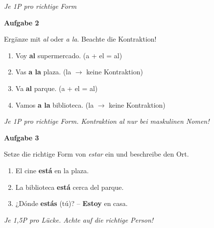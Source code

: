\documentclass[11pt, a4paper]{article}
\newcommand{\fachfarbe}{spanisch}
\newcommand{\punktebox}[1]{\hfill\fbox{\small \_/#1}}
\newcommand{\loesung}[1]{\textcolor{loesung}{\textbf{#1}}}
\newenvironment{aufgabe}[1]{%
    \vspace{10pt}
    \noindent\textbf{\textcolor{\fachfarbe}{Aufgabe #1}}
    \vspace{5pt}
    \begin{list}{}{\leftmargin=0pt}
    \item[]
}{%
    \end{list}
}
\begin{document}
\textit{\textcolor{grau}{Je 1P pro richtige Form}}

\vspace{15pt}


\begin{aufgabe}{2}
Ergänze mit \textit{al} oder \textit{a la}. Beachte die Kontraktion! \punktebox{4}
\end{aufgabe}

\begin{enumerate}[label=\alph*)]
    \item Voy \loesung{al} supermercado. (a + el = al)
    \item Vas \loesung{a la} plaza. (la $\rightarrow$ keine Kontraktion)
    \item Va \loesung{al} parque. (a + el = al)
    \item Vamos \loesung{a la} biblioteca. (la $\rightarrow$ keine Kontraktion)
\end{enumerate}

\textit{\textcolor{grau}{Je 1P pro richtige Form. Kontraktion \textit{al} nur bei maskulinen Nomen!}}

\vspace{15pt}


\begin{aufgabe}{3}
Setze die richtige Form von \textit{estar} ein und beschreibe den Ort. \punktebox{6}
\end{aufgabe}

\begin{enumerate}[label=\alph*)]
    \item El cine \loesung{está} en la plaza.
    \item La biblioteca \loesung{está} cerca del parque.
    \item ¿Dónde \loesung{estás} (tú)? -- \loesung{Estoy} en casa.
\end{enumerate}

\textit{\textcolor{grau}{Je 1,5P pro Lücke. Achte auf die richtige Person!}}

\vspace{15pt}
\end{document}
